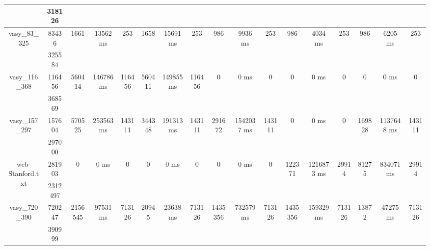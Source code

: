 \documentclass[../master/master.tex]{subfiles}
\begin{document}
\begin{center}
\begin{tabular}{ |c|c||c|c|c||c|c|c||c|c|c||c|c|c||c|c|c| }
\cline{2-2}
 & 318126  &  &  &  &  &  &  &  &  &  &  &  &  &  &  &  \\
\hline
\multirow{2}{4em}{vasy\_83\_325} & 83436 & \multirow{2}{4em}{1661} & \multirow{2}{4em}{13562 ms} & \multirow{2}{4em}{253} & \multirow{2}{4em}{1658} & \multirow{2}{4em}{15691 ms} & \multirow{2}{4em}{253} & \multirow{2}{4em}{986} & \multirow{2}{4em}{9936 ms} & \multirow{2}{4em}{253} & \multirow{2}{4em}{986} & \multirow{2}{4em}{4034 ms} & \multirow{2}{4em}{253} & \multirow{2}{4em}{986} & \multirow{2}{4em}{6205 ms} & \multirow{2}{4em}{253} \\
\cline{2-2}
 & 325584  &  &  &  &  &  &  &  &  &  &  &  &  &  &  &  \\
\hline
\multirow{2}{4em}{vasy\_116\_368} & 116456 & \multirow{2}{4em}{560414} & \multirow{2}{4em}{146786 ms} & \multirow{2}{4em}{116456} & \multirow{2}{4em}{560411} & \multirow{2}{4em}{149855 ms} & \multirow{2}{4em}{116456} & \multirow{2}{4em}{0} & \multirow{2}{4em}{0 ms} & \multirow{2}{4em}{0} & \multirow{2}{4em}{0} & \multirow{2}{4em}{0 ms} & \multirow{2}{4em}{0} & \multirow{2}{4em}{0} & \multirow{2}{4em}{0 ms} & \multirow{2}{4em}{0} \\
\cline{2-2}
 & 368569  &  &  &  &  &  &  &  &  &  &  &  &  &  &  &  \\
\hline
\multirow{2}{4em}{vasy\_157\_297} & 157604 & \multirow{2}{4em}{570525} & \multirow{2}{4em}{253563 ms} & \multirow{2}{4em}{143111} & \multirow{2}{4em}{344348} & \multirow{2}{4em}{191313 ms} & \multirow{2}{4em}{143111} & \multirow{2}{4em}{291672} & \multirow{2}{4em}{1542037 ms} & \multirow{2}{4em}{143111} & \multirow{2}{4em}{0} & \multirow{2}{4em}{0 ms} & \multirow{2}{4em}{0} & \multirow{2}{4em}{169828} & \multirow{2}{4em}{1137648 ms} & \multirow{2}{4em}{143111} \\
\cline{2-2}
 & 297000  &  &  &  &  &  &  &  &  &  &  &  &  &  &  &  \\
\hline
\multirow{2}{4em}{web-Stanford.txt} & 281903 & \multirow{2}{4em}{0} & \multirow{2}{4em}{0 ms} & \multirow{2}{4em}{0} & \multirow{2}{4em}{0} & \multirow{2}{4em}{0 ms} & \multirow{2}{4em}{0} & \multirow{2}{4em}{0} & \multirow{2}{4em}{0 ms} & \multirow{2}{4em}{0} & \multirow{2}{4em}{122371} & \multirow{2}{4em}{1216873 ms} & \multirow{2}{4em}{29914} & \multirow{2}{4em}{81275} & \multirow{2}{4em}{834071 ms} & \multirow{2}{4em}{29914} \\
\cline{2-2}
 & 2312497  &  &  &  &  &  &  &  &  &  &  &  &  &  &  &  \\
\hline
\multirow{2}{4em}{vasy\_720\_390} & 720247 & \multirow{2}{4em}{2156545} & \multirow{2}{4em}{97531 ms} & \multirow{2}{4em}{713126} & \multirow{2}{4em}{20945} & \multirow{2}{4em}{23638 ms} & \multirow{2}{4em}{713126} & \multirow{2}{4em}{1435356} & \multirow{2}{4em}{732579 ms} & \multirow{2}{4em}{713126} & \multirow{2}{4em}{1435356} & \multirow{2}{4em}{159329 ms} & \multirow{2}{4em}{713126} & \multirow{2}{4em}{13872} & \multirow{2}{4em}{47275 ms} & \multirow{2}{4em}{713126} \\
\cline{2-2}
 & 390999  &  &  &  &  &  &  &  &  &  &  &  &  &  &  &  \\
\hline
\end{tabular}
\end{center}
\end{document}

